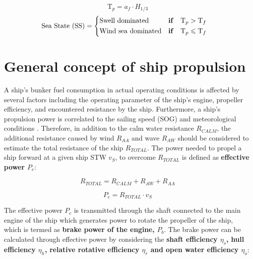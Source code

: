 \begin{equation}\label{eqn:T_p_spectralpeak}
    \text{T}_p = a_f\cdot H_{1/3}
\end{equation}
\begin{equation}
    \label{eqn:H_s_and_Tp}
    \text{Sea State (SS)} = 
    \begin{cases}
        \begin{aligned}
            &\text{Swell dominated}  &&\text{\textbf{if}} \quad \text{T}_p > \text{T}_f \\ 
            &\text{Wind sea dominated} && \text{\textbf{if}} \quad \text{T}_p \leqslant \text{T}_f 
        \end{aligned}     
    \end{cases} 
\end{equation}

\pagebreak

\section{General concept of ship propulsion}\label{sec:power_calc}

A ship's bunker fuel consumption in actual operating conditions is affected by several factors including the operating parameter of the ship's engine, propeller efficiency, and encountered resistance by the ship. Furthermore, a ship's propulsion power is correlated to the sailing speed (SOG) and meteorological conditions . Therefore, in addition to the calm water resistance $R_{CALM}$, the additional resistance caused by wind $R_{AA}$ and wave $R_{AW}$ should be considered to estimate the total resistance of the ship $R_{TOTAL}$. The power needed to propel a ship forward at a given ship STW $v_S$, to overcome $R_{TOTAL}$ is defined as \textbf{effective power $P_e$}:

\begin{equation}\label{eqn:R_tot}
    R_{TOTAL} = R_{CALM} + R_{AW} + R_{AA} 
\end{equation}

\begin{equation}\label{eqn:P_e}
    P_e = R_{TOTAL}\cdot v_{S}
\end{equation}

The effective power $P_e$ is transmitted through the shaft connected to the main engine of the ship which generates power to rotate the propeller of the ship, which is termed as \textbf{brake power of the engine, $P_b$}. The brake power can be calculated through effective power by considering the \textbf{shaft efficiency $\eta_s$, hull efficiency $\eta_h$, relative rotative efficiency $\eta_r$ and open water efficiency $\eta_o$}:

